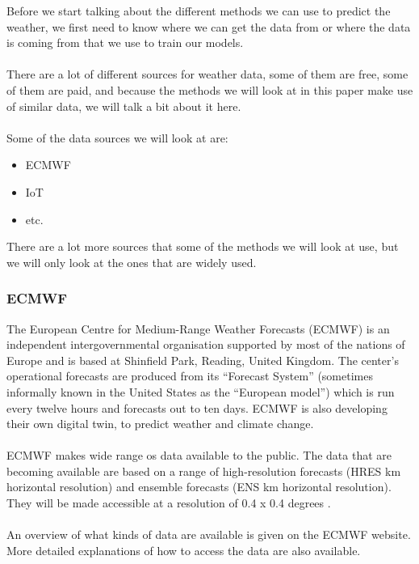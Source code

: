 \documentclass[../paper.tex]{subfiles}
\begin{document}
    Before we start talking about the different methods we can use to predict the weather, we first need to know where we can get the data from or where the data is coming from that we use to train our models.
    \\\\
    There are a lot of different sources for weather data, some of them are free, some of them are paid, and because the methods we will look at in this paper make use of similar data, we will talk a bit about it here.
    \\\\
    Some of the data sources we will look at are:
    \begin{itemize}
        \item ECMWF
        \item IoT
        \item etc.
    \end{itemize}
    There are a lot more sources that some of the methods we will look at use, but we will only look at the ones that are widely used.
    \subsubsection{ECMWF}
    The European Centre for Medium-Range Weather Forecasts (ECMWF) is an independent intergovernmental organisation supported by most of the nations of Europe and is based at Shinfield Park, Reading, United Kingdom.
    The center's operational forecasts are produced from its ``Forecast System'' (sometimes informally known in the United States as the ``European model'') which is run every twelve hours and forecasts out to ten days\cite{b4}.
    ECMWF is also developing their own digital twin, to predict weather and climate change\cite{b5}.
    \\\\
    ECMWF makes wide range os data available to the public.
    The data that are becoming available are based on a range of high-resolution forecasts (HRES  km horizontal resolution) and ensemble forecasts (ENS  km horizontal resolution).
    They will be made accessible at a resolution of 0.4 x 0.4 degrees \cite{ecmwf_data_free}.
    \\\\
    An overview of what kinds of data are available is given on the ECMWF website.
    More detailed explanations of how to access the data are also available\cite{ecmwf_data_free}.
\end{document}
